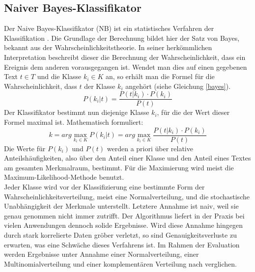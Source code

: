 \subsection{Naiver Bayes-Klassifikator}
Der Naive Bayes-Klassifikator (NB) ist ein statistisches Verfahren der Klassifikation \citep{Rish01}. Die Grundlage der Berechnung bildet hier der Satz von Bayes, bekannt aus der Wahrscheinlichkeitstheorie. In seiner herkömmlichen Interpretation beschreibt dieser die Berechnung der Wahrscheinlichkeit, dass ein Ereignis dem anderen vorausgegangen ist. Wendet man dies auf einen gegebenen Text $t \in T$ und die Klasse $k_i \in K$ an, so erhält man die Formel für die Wahrscheinlichkeit, dass $t$ der Klasse $k_i$ angehört (siehe Gleichung \ref{bayes}).
\begin{equation}
	P(k_i|t) = \frac{P(t|k_i) \cdot P(k_i)}{P(t)}
	\label{bayes}
\end{equation}
Der Klassifikator bestimmt nun diejenige Klasse $k_i$, für die der Wert dieser Formel maximal ist. Mathematisch formuliert:
\begin{equation}
	k = arg \max\limits_{k_i \in K} P(k_i|t) = arg \max\limits_{k_i \in K} \frac{P(t|k_i) \cdot P(k_i)}{P(t)}
\end{equation}
Die Werte für $P(k_i)$ und $P(t)$ werden a priori über relative Anteilshäufigkeiten, also über den Anteil einer Klasse und den Anteil eines Textes am gesamten Merkmalraum, bestimmt. Für die Maximierung wird meist die Maximum-Likelihood-Methode benutzt.\\
Jeder Klasse wird vor der Klassifizierung eine bestimmte Form der Wahrscheinlichkeitsverteilung, meist eine Normalverteilung, und die stochastische Unabhängigkeit der Merkmale unterstellt. Letztere Annahme ist \glqq naiv\grqq{}, weil sie genau genommen nicht immer zutrifft. Der Algorithmus liefert in der Praxis bei vielen Anwendungen dennoch solide Ergebnisse. Wird diese Annahme hingegen durch stark korrelierte Daten gröber verletzt, so sind Genauigkeitsverluste zu erwarten, was eine Schwäche dieses Verfahrens ist. Im Rahmen der Evaluation werden Ergebnisse unter Annahme einer Normalverteilung, einer Multinomialverteilung und einer komplementären Verteilung nach \citet{rennie03} verglichen.
\pagebreak
